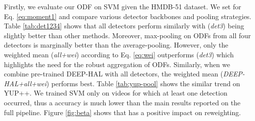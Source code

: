 \vspace{0.05cm}
Firstly, we evaluate our ODF on SVM given the HMDB-51 dataset. We set  for Eq. \eqref{eq:moment1} and compare various detector backbones and pooling strategies. Table \ref{tab:det1234} shows that all detectors perform similarly with ({\em det3}) being slightly better than other methods. Moreover, max-pooling on ODFs from all four detectors is marginally better than the average-pooling. However, only the weighted mean ({\em all+wei}) according to Eq. \eqref{eq:wei} outperforms ({\em det3}) which highlights the need for the robust aggregation of ODFs. Similarly, when we combine pre-trained DEEP-HAL with all detectors, the weighted mean ({\em DEEP-HAL+all+wei}) performs best. Table \ref{tab:yup-pool} shows the similar trend on YUP++. We trained SVM only on videos for which at least one  detection occurred, thus a  accuracy is much lower than the main results reported on the full pipeline. Figure \ref{fig:beta} shows that   has a positive impact on reweighting.




